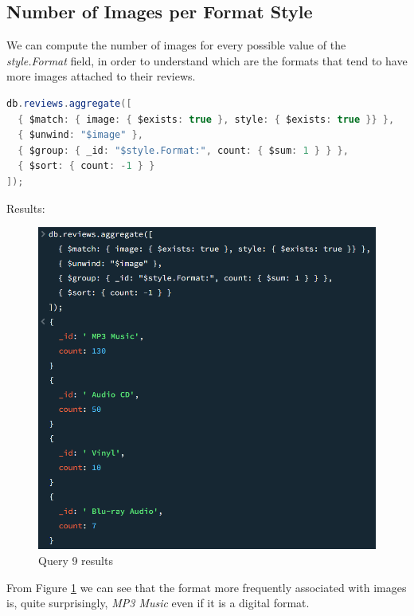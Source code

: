 \subsection{Number of Images per Format Style}
We can compute the number of images for every possible value of the \textit{style.Format} field, in order to understand which are the formats that tend to have more images attached to their reviews. \\
\begin{lstlisting}[language=Java]
db.reviews.aggregate([
  { $match: { image: { $exists: true }, style: { $exists: true }} },
  { $unwind: "$image" },
  { $group: { _id: "$style.Format:", count: { $sum: 1 } } },
  { $sort: { count: -1 } }
]);
\end{lstlisting}
Results:
\begin{figure}[H]
  \centering
  \includegraphics[scale=0.6]{Images/q9_result.png}
  \caption{Query 9 results}
  \label{fig:q9_result}
\end{figure}
From Figure \ref{fig:q9_result} we can see that the format more frequently associated with images is, quite surprisingly, \textit{MP3 Music} even if it is a digital format. \\

\newpage
